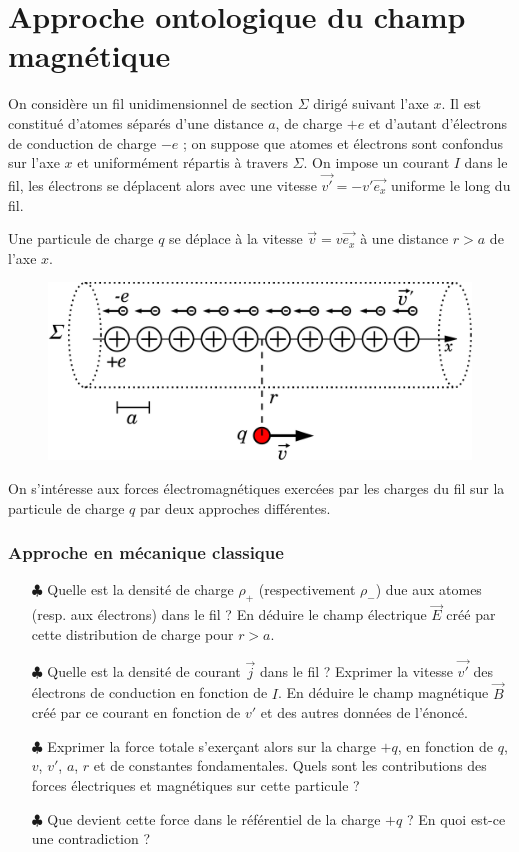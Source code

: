 \documentclass{report}
\begin{document}
\section*{Approche ontologique du champ magnétique}

On considère un fil unidimensionnel de section $\Sigma$ dirigé suivant l'axe $x$. Il est constitué d'atomes séparés d'une distance $a$, de charge $+e$  et d'autant d'électrons de conduction de charge $-e$ ; on suppose que atomes et électrons sont confondus sur l'axe $x$ et uniformément répartis à travers $\Sigma$. On impose un courant $I$ dans le fil, les électrons se déplacent alors avec une vitesse $\vec{v'}=-v'\vec{e_{x}}$ uniforme le long du fil.

Une particule de charge $q$ se déplace à la vitesse $\vec{v}=v\vec{e_{x}}$ à une distance $r>a$ de l'axe $x$.

\begin{figure}[h!]
\centering
		\includegraphics[scale=0.25]{cable.pdf}
\end{figure}

On s'intéresse aux forces électromagnétiques exercées par les charges du fil sur la particule de charge $q$ par deux approches différentes.

\subsubsection*{Approche en mécanique classique}

\begin{itemize}
	\item[$\clubsuit$] Quelle est la densité de charge $\rho_{+}$ (respectivement $\rho_{-}$) due aux atomes (resp. aux électrons) dans le fil ? En déduire le champ électrique $\vec{E}$ créé par cette distribution de charge pour $r>a$.
	
	\item[$\clubsuit$] Quelle est la densité de courant $\vec{j}$ dans le fil ? Exprimer la vitesse $\vec{v'}$ des électrons de conduction en fonction de $I$. En déduire le champ magnétique $\vec{B}$ créé par ce courant en fonction de $v'$ et des autres données de l'énoncé.
	\item[$\clubsuit$] Exprimer la force totale s'exerçant alors sur la charge $+q$, en fonction de $q$, $v$, $v'$, $a$, $r$ et de constantes fondamentales. Quels sont les contributions des forces électriques et magnétiques sur cette particule ?
	\item[$\clubsuit$] Que devient cette force dans le référentiel de la charge $+q$ ? En quoi est-ce une contradiction ?
\end{itemize}
\end{document}
